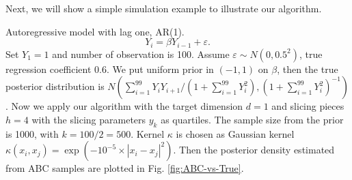 Next, we will show a simple simulation example to illustrate our algorithm.
\begin{example}
Autoregressive model with lag one, AR(1). 
\[
Y_{i}=\beta Y_{i-1}+\varepsilon.
\]
Set $Y_{1}=1$ and number of observation is 100. Assume $\varepsilon\sim N\left(0,0.5^{2}\right)$,
true regression coefficient 0.6. We put uniform prior in $\left(-1,1\right)$
on $\beta$, then the true posterior distribution is $N\left(\sum_{i=1}^{99}Y_{i}Y_{i+1}/\left(1+\sum_{i=1}^{99}Y_{i}^{2}\right),\left(1+\sum_{i=1}^{99}Y_{i}^{2}\right)^{-1}\right)$.
Now we apply our algorithm with the target dimension $d=1$ and slicing
pieces $h=4$ with the slicing parameters $y_{k}$ as quartiles. The
sample size from the prior is 1000, with $k=100/2=500$. Kernel $\kappa$
is chosen as Gaussian kernel $\kappa\left(x_{i},x_{j}\right)=\exp\left(-10^{-5}\times |x_{i}-x_{j} |^{2}\right)$.
Then the posterior density estimated from ABC samples are plotted
in Fig. \ref{fig:ABC-vs-True}. %

\end{example}
